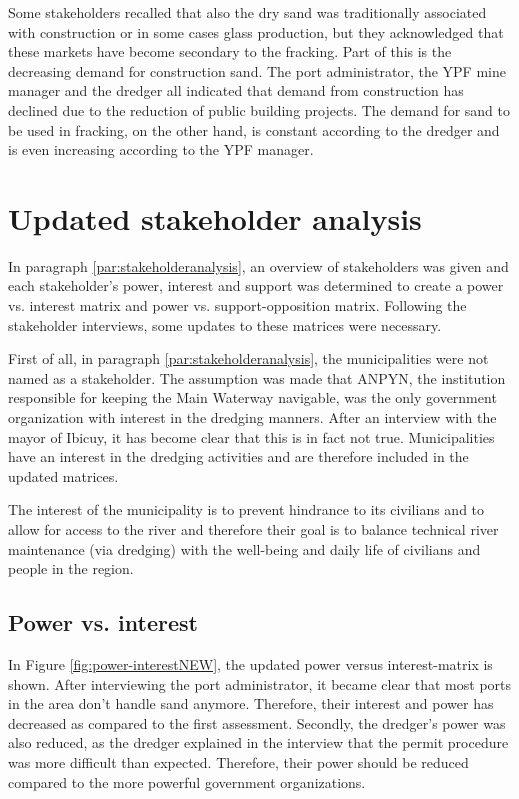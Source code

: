 Some stakeholders recalled that also the dry sand was traditionally associated with construction or in some cases glass production, but they acknowledged that these markets have become secondary to the fracking. Part of this is the decreasing demand for construction sand. The port administrator, the YPF mine manager and the dredger all indicated that demand from construction has declined due to the reduction of public building projects. The demand for sand to be used in fracking, on the other hand, is constant according to the dredger and is even increasing according to the YPF manager.

\section{Updated stakeholder analysis}
In paragraph \ref{par:stakeholderanalysis}, an overview of stakeholders was given and each stakeholder's power, interest and support was determined to create a power vs. interest matrix and power vs. support-opposition matrix. Following the stakeholder interviews, some updates to these matrices were necessary.

First of all, in paragraph \ref{par:stakeholderanalysis}, the municipalities were not named as a stakeholder. The assumption was made that ANPYN, the institution responsible for keeping the Main Waterway navigable, was the only government organization with interest in the dredging manners. After an interview with the mayor of Ibicuy, it has become clear that this is in fact not true. Municipalities have an interest in the dredging activities and are therefore included in the updated matrices.

The interest of the municipality is to prevent hindrance to its civilians and to allow for access to the river and therefore their goal is to balance technical river maintenance (via dredging) with the well-being and daily life of civilians and people in the region.

\subsection{Power vs. interest}
In Figure \ref{fig:power-interestNEW}, the updated power versus interest-matrix is shown. After interviewing the port administrator, it became clear that most ports in the area don't handle sand anymore. Therefore, their interest and power has decreased as compared to the first assessment. Secondly, the dredger's power was also reduced, as the dredger explained in the interview that the permit procedure was more difficult than expected. Therefore, their power should be reduced compared to the more powerful government organizations.


